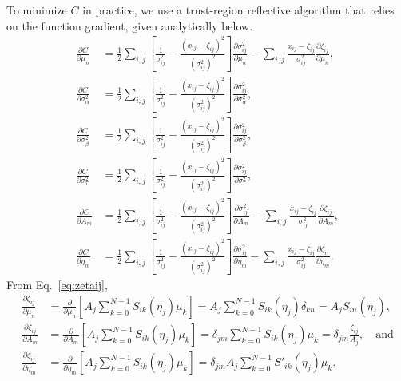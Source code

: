 \documentclass[aps, prb, onecolumn, floatfix, amssymb, superscriptaddress, nofootinbib, longbibliography]{revtex4-2}
\begin{document}
To minimize $C$ in practice, we use a trust-region reflective algorithm that relies on the function gradient, given analytically below.
\begin{subequations}
\begin{align}
\frac{\partial C}{\partial \mu_n} &= \frac{1}{2}\sum_{i,j}\left[\frac{1}{\sigma_{ij}^2} - \frac{(x_{ij} - \zeta_{ij})^2}{\left(\sigma_{ij}^2\right)^2}\right]\frac{\partial\sigma_{ij}^2}{\partial\mu_n} - \sum_{i,j}\frac{x_{ij} - \zeta_{ij}}{\sigma_{ij}^2}\frac{\partial\zeta_{ij}}{\partial\mu_n},\\
\frac{\partial C}{\partial \sigma_\alpha^2} &= \frac{1}{2}\sum_{i,j}\left[\frac{1}{\sigma_{ij}^2} - \frac{(x_{ij} - \zeta_{ij})^2}{\left(\sigma_{ij}^2\right)^2}\right]\frac{\partial\sigma_{ij}^2}{\partial\sigma_\alpha^2},\\
\frac{\partial C}{\partial \sigma_\beta^2} &= \frac{1}{2}\sum_{i,j}\left[\frac{1}{\sigma_{ij}^2} - \frac{(x_{ij} - \zeta_{ij})^2}{\left(\sigma_{ij}^2\right)^2}\right]\frac{\partial\sigma_{ij}^2}{\partial\sigma_\beta^2},\\
\frac{\partial C}{\partial \sigma_\tau^2} &= \frac{1}{2}\sum_{i,j}\left[\frac{1}{\sigma_{ij}^2} - \frac{(x_{ij} - \zeta_{ij})^2}{\left(\sigma_{ij}^2\right)^2}\right]\frac{\partial\sigma_{ij}^2}{\partial\sigma_\tau^2},\\
\frac{\partial C}{\partial A_m} &= \frac{1}{2}\sum_{i,j}\left[\frac{1}{\sigma_{ij}^2} - \frac{(x_{ij} - \zeta_{ij})^2}{\left(\sigma_{ij}^2\right)^2}\right]\frac{\partial\sigma_{ij}^2}{\partial A_m} - \sum_{i,j}\frac{x_{ij} - \zeta_{ij}}{\sigma_{ij}^2}\frac{\partial\zeta_{ij}}{\partial A_m},\\
\frac{\partial C}{\partial \eta_m} &= \frac{1}{2}\sum_{i,j}\left[\frac{1}{\sigma_{ij}^2} - \frac{(x_{ij} - \zeta_{ij})^2}{\left(\sigma_{ij}^2\right)^2}\right]\frac{\partial\sigma_{ij}^2}{\partial \eta_m} - \sum_{i,j}\frac{x_{ij} - \zeta_{ij}}{\sigma_{ij}^2}\frac{\partial\zeta_{ij}}{\partial \eta_m}.
\end{align}
\label{eq:dCdtheta}
\end{subequations}
From Eq.~\ref{eq:zetaij},
\begin{subequations}
\begin{align}
\frac{\partial\zeta_{ij}}{\partial\mu_n} &= \frac{\partial}{\partial \mu_n}\left[A_j\sum_{k=0}^{N-1} S_{ik}(\eta_j)\mu_k\right] = A_j\sum_{k=0}^{N-1} S_{ik}(\eta_j)\delta_{kn}= A_j S_{in}(\eta_j),\\
\frac{\partial\zeta_{ij}}{\partial A_m} &= \frac{\partial}{\partial A_m}\left[A_j\sum_{k=0}^{N-1} S_{ik}(\eta_j)\mu_k\right] = \delta_{jm}\sum_{k=0}^{N-1} S_{ik}(\eta_j)\mu_{k}= \delta_{jm}\frac{\zeta_{ij}}{A_j},\quad\text{and}\\
\frac{\partial\zeta_{ij}}{\partial \eta_m} &= \frac{\partial}{\partial \eta_m}\left[A_j\sum_{k=0}^{N-1} S_{ik}(\eta_j)\mu_k\right] = \delta_{jm}A_j\sum_{k=0}^{N-1} S'_{ik}(\eta_j)\mu_{k}.
\end{align}
\label{eq:dzetadmuAeta}
\end{subequations}
\end{document}
